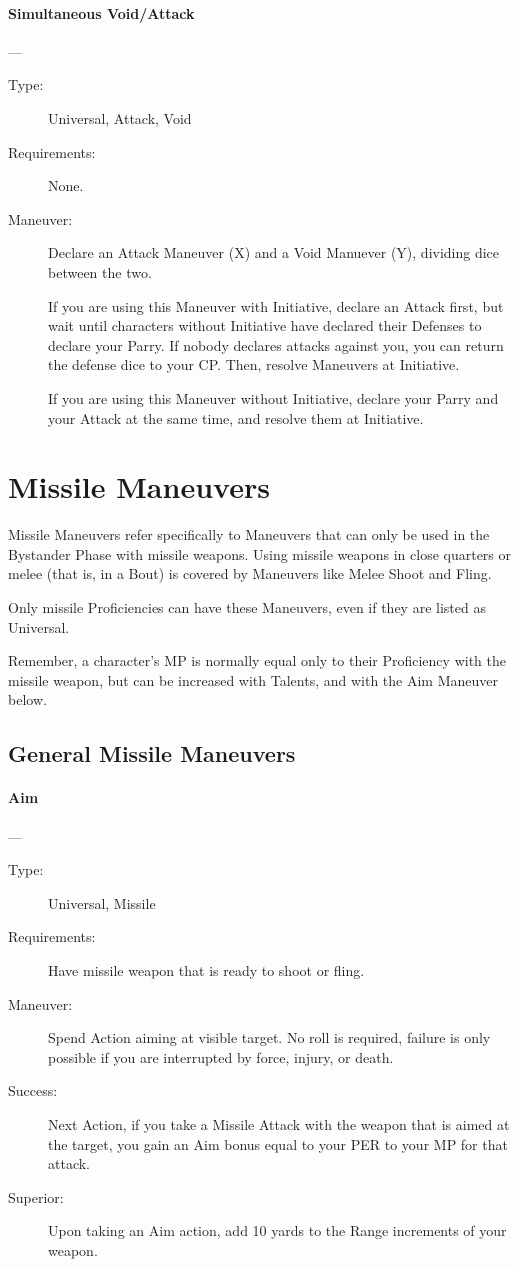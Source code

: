 \documentclass[oneside,11pt,english]{book}
\begin{document}
\paragraph{\large\label{man:Simultaneous Void/Attack}Simultaneous Void/Attack}---\quad{\large[X+Y+2]}
\vspace{-10pt}\begin{description} 
\item [Type:] Universal, Attack, Void 
\item [Requirements:] None. 
\item [Maneuver:] Declare an Attack Maneuver (X) and a Void Manuever (Y), dividing dice between the two. 

  If you are using this Maneuver with Initiative, declare an Attack first, but wait until characters without Initiative have declared their Defenses to declare your Parry. If nobody declares attacks against you, you can return the defense dice to your CP. Then, resolve Maneuvers at Initiative.

  If you are using this Maneuver without Initiative, declare your Parry and your Attack at the same time, and resolve them at Initiative. 
\end{description}
\section{Missile Maneuvers}
Missile Maneuvers refer specifically to Maneuvers that can only be used in the Bystander Phase with 
missile weapons. Using missile weapons in close quarters or melee (that is, in a Bout) is covered by 
Maneuvers like Melee Shoot and Fling. 

Only missile Proficiencies can have these Maneuvers, even if they are listed as Universal. 

Remember, a character’s MP is normally equal only to their Proficiency with the missile weapon, but can 
be increased with Talents, and with the Aim Maneuver below. 
\subsection{General Missile Maneuvers}
\paragraph{\large\label{man:Aim}Aim}---\quad{\large[0]}
\vspace{-10pt}\begin{description} 
\item [Type:] Universal, Missile 
\item [Requirements:] Have missile weapon that is ready to shoot or fling. 
\item [Maneuver:] Spend Action aiming at visible target. No roll is required, failure is only possible if you are 
  interrupted by force, injury, or death. 
\item [Success:] Next Action, if you take a Missile Attack with the weapon that is aimed at the target, you gain 
  an Aim bonus equal to your PER to your MP for that attack. 
\item [Superior:] Upon taking an Aim action, add 10 yards to the Range increments of your weapon. 
\end{description}
\end{document}
